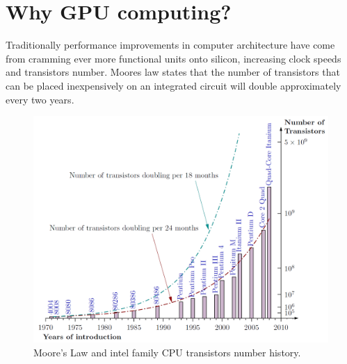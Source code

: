 \section{Why GPU computing?}
Traditionally performance improvements in computer architecture have come from
cramming ever more functional units onto silicon, increasing clock speeds and
transistors number. Moores law\cite{mooreLaw1965} states that the number of
transistors that can be placed inexpensively on an integrated circuit will
double approximately every two years.
\begin{figure}
\centering
\includegraphics[totalheight=0.5\textheight]{./images/moore_law_large}
\caption{Moore's Law and intel family CPU transistors number
history.}\label{mooreLaw}
\end{figure}

